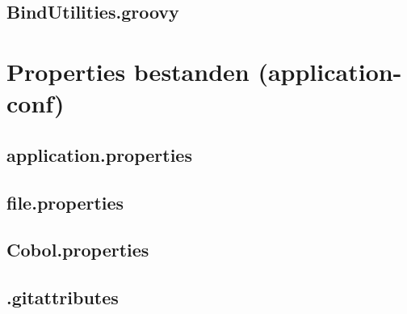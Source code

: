\documentclass[dutch,dit,thesis]{hogentreport}
\begin{document}
\pagebreak
\section{BindUtilities.groovy}
\label{sec:bindutilgroovy}



\chapter{Properties bestanden (application-conf)}
\label{ch:appropappli}
\section{application.properties}
\label{sec:appliprops}


\pagebreak
\section{file.properties}
\label{sec:fileprops}


\pagebreak
\section{Cobol.properties}
\label{sec:cobpropsappli}


\pagebreak
\section{.gitattributes}
\label{sec:gitattr}




\backmatter{}

\setlength\bibitemsep{2pt} %
\printbibliography[heading=bibintoc]
\end{document}
